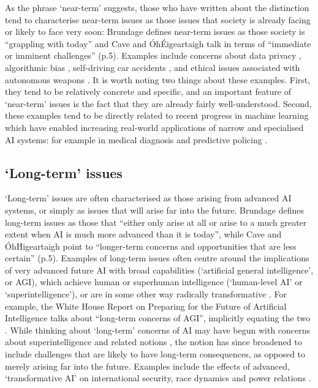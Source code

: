 \documentclass[sigconf]{acmart}
\begin{document}
As the phrase `near-term' suggests, those who have written about the distinction tend to characterise near-term issues as those issues that society is already facing or likely to face very soon: Brundage \cite{brundage_guide_2017} defines near-term issues as those society is ``grappling with today'' and Cave and \'{O}h\'{E}igeartaigh \cite{cave_bridging_2019} talk in terms of ``immediate or imminent challenges'' (p.5). Examples include concerns about data privacy \cite{tucker2018privacy,zuboff2019age}, algorithmic bias \cite{hajian2016algorithmic,koene2017algorithmic}, self-driving car accidents \cite{goodall2016can,bonnefon2016social}, and ethical issues associated with autonomous weapons \cite{asaro2012banning,anderson2013law}. It is worth noting two things about these examples. First, they tend to be relatively concrete and specific, and an important feature of `near-term' issues is the fact that they are already fairly well-understood. Second, these examples tend to be directly related to recent progress in machine learning which have enabled increasing real-world applications of narrow and specialised AI systems: for example in medical diagnosis and predictive policing \cite{buch_artificial_2018,richardson_dirty_2019}. 

\subsection{`Long-term' issues}

`Long-term' issues are often characterised as those arising from advanced AI systems, or simply as issues that will arise far into the future. Brundage \cite{brundage_guide_2017} defines long-term issues as those that ``either only arise at all or arise to a much greater extent when AI is much more advanced than it is today'', while Cave and \'{O}h\'{H}igeartaigh \cite{cave_bridging_2019} point to ``longer-term concerns and opportunities that are less certain'' (p.5). Examples of long-term issues often centre around the implications of very advanced future AI with broad capabilities (`artificial general intelligence', or AGI), which achieve human or superhuman intelligence (`human-level AI' or `superintelligence'), or are in some other way radically transformative \cite{karnofsky_potential_2016}. For example, the White House Report on Preparing for the Future of Artificial Intelligence talks about ``long-term concerns of AGI'', implicitly equating the two \cite{whitehouse_2016}. While thinking about `long-term' concerns of AI may have begun with concerns about superintelligence and related notions \cite{bostrom_superintelligence_2014}, the notion has since broadened to include challenges that are likely to have long-term consequences, as opposed to merely arising far into the future. Examples include the effects of advanced, `transformative AI' on  international security, race dynamics and power relations \cite{karnofsky_potential_2016,dafoe_ai_2018,gruetzemacher_2019}. 
\end{document}
